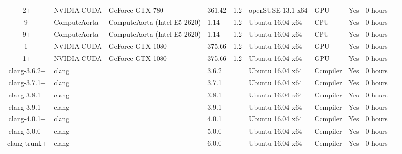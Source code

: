 \begin{tabular}{ cllllllL{1cm} | rR{1.4cm} }
2+ & NVIDIA CUDA & GeForce GTX 780 & 361.42 & 1.2 & openSUSE 13.1 x64 & GPU & Yes & 0 hours \\
9- & ComputeAorta & ComputeAorta (Intel E5-2620) & 1.14 & 1.2 & Ubuntu 16.04 x64 & CPU & Yes & 0 hours \\
9+ & ComputeAorta & ComputeAorta (Intel E5-2620) & 1.14 & 1.2 & Ubuntu 16.04 x64 & CPU & Yes & 0 hours \\
1- & NVIDIA CUDA & GeForce GTX 1080 & 375.66 & 1.2 & Ubuntu 16.04 x64 & GPU & Yes & 0 hours \\
1+ & NVIDIA CUDA & GeForce GTX 1080 & 375.66 & 1.2 & Ubuntu 16.04 x64 & GPU & Yes & 0 hours \\
clang-3.6.2+ & clang &  & 3.6.2 &  & Ubuntu 16.04 x64 & Compiler & Yes & 0 hours \\
clang-3.7.1+ & clang &  & 3.7.1 &  & Ubuntu 16.04 x64 & Compiler & Yes & 0 hours \\
clang-3.8.1+ & clang &  & 3.8.1 &  & Ubuntu 16.04 x64 & Compiler & Yes & 0 hours \\
clang-3.9.1+ & clang &  & 3.9.1 &  & Ubuntu 16.04 x64 & Compiler & Yes & 0 hours \\
clang-4.0.1+ & clang &  & 4.0.1 &  & Ubuntu 16.04 x64 & Compiler & Yes & 0 hours \\
clang-5.0.0+ & clang &  & 5.0.0 &  & Ubuntu 16.04 x64 & Compiler & Yes & 0 hours \\
clang-trunk+ & clang &  & 6.0.0 &  & Ubuntu 16.04 x64 & Compiler & Yes & 0 hours \\

\bottomrule
\end{tabular}

